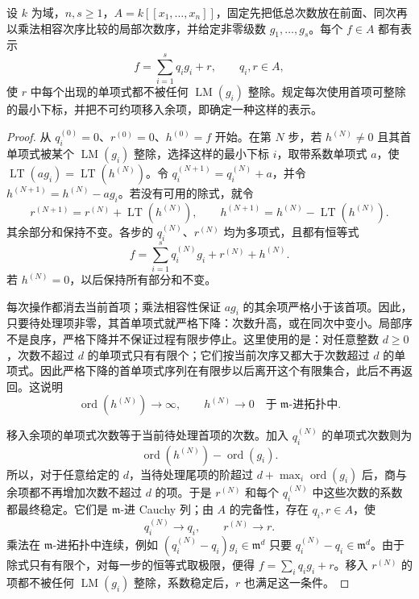 \begin{theorem}[形式除法]\label{b3:thm:F-formal-division}
	设 \(k\) 为域，\(n,s\ge1\)，\(A=k[\![x_1,\ldots,x_n]\!]\)，固定先把低总次数放在前面、同次再以乘法相容次序比较的局部次数序，并给定非零级数 \(g_1,\ldots,g_s\)。每个 \(f\in A\) 都有表示
	\[
		f=\sum_{i=1}^s q_i g_i+r,\qquad q_i,r\in A,
	\]
	使 \(r\) 中每个出现的单项式都不被任何 \(\operatorname{LM}(g_i)\) 整除。规定每次使用首项可整除的最小下标，并把不可约项移入余项，即确定一种这样的表示。
\end{theorem}
\begin{proof}
	从 \(q_i^{(0)}=0\)、\(r^{(0)}=0\)、\(h^{(0)}=f\) 开始。在第 \(N\) 步，若 \(h^{(N)}\ne0\) 且其首单项式被某个 \(\operatorname{LM}(g_i)\) 整除，选择这样的最小下标 \(i\)，取带系数单项式 \(a\)，使 \(\operatorname{LT}(a g_i)=\operatorname{LT}(h^{(N)})\)。令 \(q_i^{(N+1)}=q_i^{(N)}+a\)，并令 \(h^{(N+1)}=h^{(N)}-a g_i\)。若没有可用的除式，就令
	\[
		r^{(N+1)}=r^{(N)}+\operatorname{LT}(h^{(N)}),\qquad h^{(N+1)}=h^{(N)}-\operatorname{LT}(h^{(N)}).
	\]
	其余部分和保持不变。各步的 \(q_i^{(N)}\)、\(r^{(N)}\) 均为多项式，且都有恒等式
	\[
		f=\sum_{i=1}^s q_i^{(N)}g_i+r^{(N)}+h^{(N)}.
	\]
	若 \(h^{(N)}=0\)，以后保持所有部分和不变。

	每次操作都消去当前首项；乘法相容性保证 \(a g_i\) 的其余项严格小于该首项。因此，只要待处理项非零，其首单项式就严格下降：次数升高，或在同次中变小。局部序不是良序，严格下降并不保证过程有限步停止。这里使用的是：对任意整数 \(d\ge0\)，次数不超过 \(d\) 的单项式只有有限个；它们按当前次序又都大于次数超过 \(d\) 的单项式。因此严格下降的首单项式序列在有限步以后离开这个有限集合，此后不再返回。这说明
	\[
		\operatorname{ord}(h^{(N)})\longrightarrow\infty, \qquad h^{(N)}\longrightarrow0 \quad\text{于}\;\mathfrak m\text{-进拓扑中}.
	\]

	移入余项的单项式次数等于当前待处理首项的次数。加入 \(q_i^{(N)}\) 的单项式次数则为
	\[
		\operatorname{ord}(h^{(N)})-\operatorname{ord}(g_i).
	\]
	所以，对于任意给定的 \(d\)，当待处理尾项的阶超过 \(d+\max_i\operatorname{ord}(g_i)\) 后，商与余项都不再增加次数不超过 \(d\) 的项。于是 \(r^{(N)}\) 和每个 \(q_i^{(N)}\) 中这些次数的系数都最终稳定。它们是 \(\mathfrak m\)-进 Cauchy 列；由 \(A\) 的完备性，存在 \(q_i,r\in A\)，使
	\[
		q_i^{(N)}\longrightarrow q_i,\qquad r^{(N)}\longrightarrow r.
	\]
	乘法在 \(\mathfrak m\)-进拓扑中连续，例如 \((q_i^{(N)}-q_i)g_i\in\mathfrak m^d\) 只要 \(q_i^{(N)}-q_i\in\mathfrak m^d\)。由于除式只有有限个，对每一步的恒等式取极限，便得 \(f=\sum_iq_i g_i+r\)。移入 \(r^{(N)}\) 的项都不被任何 \(\operatorname{LM}(g_i)\) 整除，系数稳定后，\(r\) 也满足这一条件。
\end{proof}

